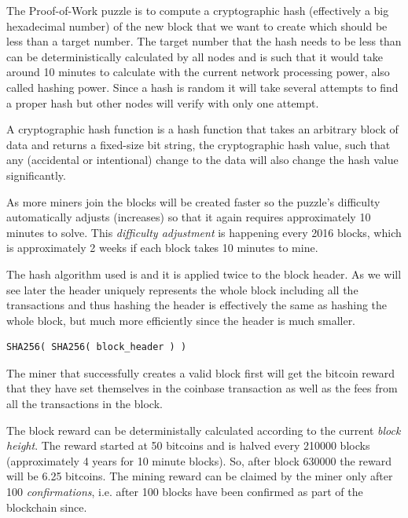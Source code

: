 The Proof-of-Work puzzle is to compute a cryptographic hash (effectively a big hexadecimal number) of the new block that we want to create which should be less than a target number. The target number that the hash needs to be less than can be deterministically calculated by all nodes and is such that it would take around 10 minutes to calculate with the current network processing power, also called hashing power. Since a hash is random it will take several attempts to find a proper hash but other nodes will verify with only one attempt.

\begin{note}
A cryptographic hash function is a hash function that takes an arbitrary block of data and returns a fixed-size bit string, the cryptographic hash value, such that any (accidental or intentional) change to the data will also change the hash value significantly.
\end{note}

As more miners join the blocks will be created faster so the puzzle’s difficulty automatically adjusts (increases) so that it again requires approximately 10 minutes to solve. This \emph{difficulty adjustment} is happening every 2016 blocks, which is approximately 2 weeks if each block takes 10 minutes to mine.

The hash algorithm used is  and it is applied twice to the block header. As we will see later the header uniquely represents the whole block including all the transactions and thus hashing the header is effectively the same as hashing the whole block, but much more efficiently since the header is much smaller.

\begin{emphbox}
\begin{lstlisting}[style=Pseudomath]
SHA256( SHA256( block_header ) )
\end{lstlisting}
\end{emphbox}

The miner that successfully creates a valid block first will get the bitcoin reward that they have set themselves in the coinbase transaction as well as the fees from all the transactions in the block.

The block reward can be deterministally calculated according to the current \emph{block height}. The reward started at 50 bitcoins and is halved every 210000 blocks (approximately 4 years for 10 minute blocks). So, after block 630000 the reward will be 6.25 bitcoins. The mining reward can be claimed by the miner only after 100 \emph{confirmations}, i.e. after 100 blocks have been confirmed as part of the blockchain since.


